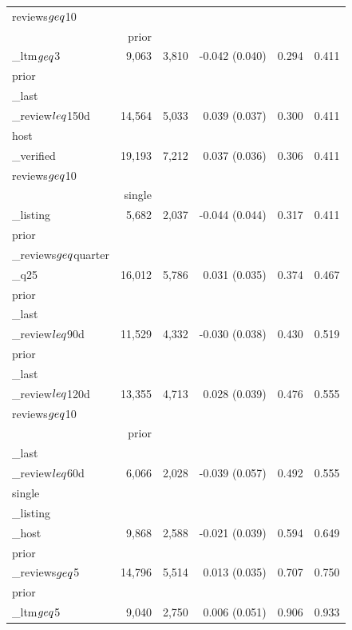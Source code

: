 \begin{table}[!htbp]
\begin{tabular}{lrrrrr}
reviews$\\geq$10 \\& prior\\_ltm$\\geq$3 & 9,063 & 3,810 & -0.042 (0.040) & 0.294 & 0.411 \\
prior\\_last\\_review$\\leq$150d & 14,564 & 5,033 & 0.039 (0.037) & 0.300 & 0.411 \\
host\\_verified & 19,193 & 7,212 & 0.037 (0.036) & 0.306 & 0.411 \\
reviews$\\geq$10 \\& single\\_listing & 5,682 & 2,037 & -0.044 (0.044) & 0.317 & 0.411 \\
prior\\_reviews$\\geq$quarter\\_q25 & 16,012 & 5,786 & 0.031 (0.035) & 0.374 & 0.467 \\
prior\\_last\\_review$\\leq$90d & 11,529 & 4,332 & -0.030 (0.038) & 0.430 & 0.519 \\
prior\\_last\\_review$\\leq$120d & 13,355 & 4,713 & 0.028 (0.039) & 0.476 & 0.555 \\
reviews$\\geq$10 \\& prior\\_last\\_review$\\leq$60d & 6,066 & 2,028 & -0.039 (0.057) & 0.492 & 0.555 \\
single\\_listing\\_host & 9,868 & 2,588 & -0.021 (0.039) & 0.594 & 0.649 \\
prior\\_reviews$\\geq$5 & 14,796 & 5,514 & 0.013 (0.035) & 0.707 & 0.750 \\
prior\\_ltm$\\geq$5 & 9,040 & 2,750 & 0.006 (0.051) & 0.906 & 0.933 \\

\end{tabular}
\end{table}
